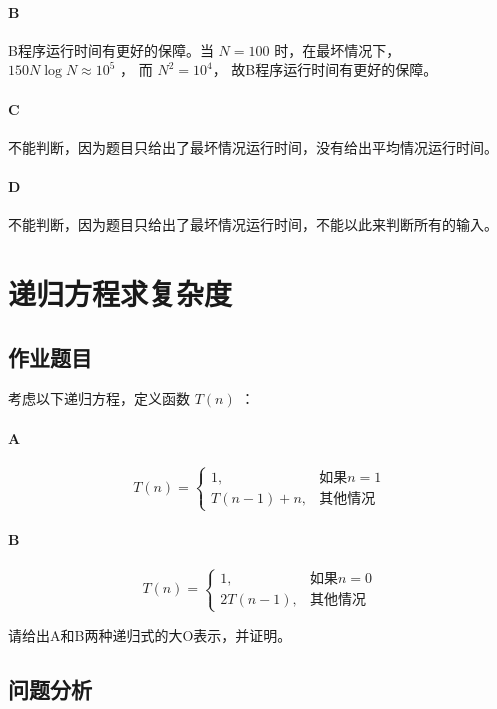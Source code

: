 \documentclass[UTF8]{ctexart}
\begin{document}
      \paragraph{B}
      B程序运行时间有更好的保障。当 $N=100$ 时，在最坏情况下， $ 150 N \log N \approx 10 ^ 5 $ ， 而 $ N^2 = 10 ^ 4 $， 故B程序运行时间有更好的保障。
      \paragraph{C}
      不能判断，因为题目只给出了最坏情况运行时间，没有给出平均情况运行时间。
      \paragraph{D}
      不能判断，因为题目只给出了最坏情况运行时间，不能以此来判断所有的输入。
  \section{递归方程求复杂度}
    \subsection{作业题目}
      考虑以下递归方程，定义函数 $T(n)$ ：
      \paragraph{A}
      \begin{equation}
        T(n) =
        \begin{cases}
          1, & \text{如果$n=1$} \\
          T(n - 1) + n, & \text{其他情况}
        \end{cases}
      \end{equation}
      \paragraph{B}
      \begin{equation}
        T(n) =
        \begin{cases}
          1, & \text{如果$n=0$} \\
          2T(n - 1), & \text{其他情况}
        \end{cases}
      \end{equation}

      请给出A和B两种递归式的大O表示，并证明。
    \subsection{问题分析}
\end{document}
